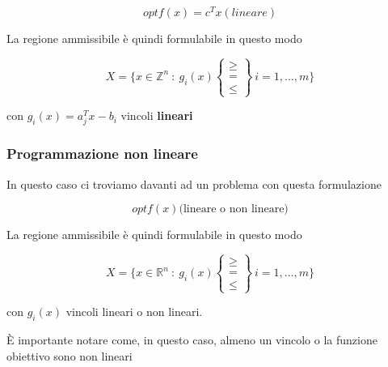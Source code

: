 $$
    opt f(x) = c^T x (lineare)
$$

La regione ammissibile è quindi formulabile in questo modo

$$
        X = \{x \in \mathbb{Z}^n \ :\  g_i(x)
        \left\{
        \begin{matrix}
        \geq \\
        = \\
        \leq
        \end{matrix}
        \right\}
        \ i=1,\dots,m
        \}
$$

con $g_i(x)=a_j^T x - b_i$ vincoli \textbf{lineari} 

\subsubsection{Programmazione non lineare}
In questo caso ci troviamo davanti ad un problema con questa formulazione

$$
    opt f(x) \text{(lineare o non lineare)}
$$

La regione ammissibile è quindi formulabile in questo modo

$$
        X = \{x \in \mathbb{R}^n \ :\  g_i(x)
        \left\{
        \begin{matrix}
        \geq \\
        = \\
        \leq
        \end{matrix}
        \right\}
        \ i=1,\dots,m
        \}
$$

con $g_i(x)$ vincoli lineari o non lineari.

È importante notare come, in questo caso, almeno un vincolo o la funzione obiettivo sono non lineari